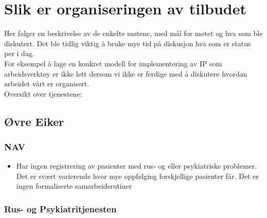 \documentclass[11pt]{report} %
\begin{document}
  \chapter{Slik er organiseringen av tilbudet}\label{chap:org}
    Her følger en beskrivelse av de enkelte møtene, med mål for møtet og hva som ble diskutert. Det ble tidlig viktig å bruke mye tid på diskusjon hva som er status per i dag.\\
    For eksempel å lage en konkret modell for implementering av IP som arbeidsverktøy er ikke lett dersom vi ikke er ferdige med å diskutere hvordan arbeidet vårt er organisert.\\
    Oversikt over tjenestene:\\
     
    \section{Øvre Eiker}\label{sec:org_oek}
        
        \subsection{NAV}
          \begin{itemize} 
            \item Har ingen registrering av pasienter med rus- og eller psykiatriske problemer. Det er svært varierende hvor mye oppfølging forskjellige pasienter får. Det er ingen formaliserte samarbeidsrutiner
          \end{itemize}
        
        \subsection{Rus- og Psykiatritjenesten}
        	
\end{document}
